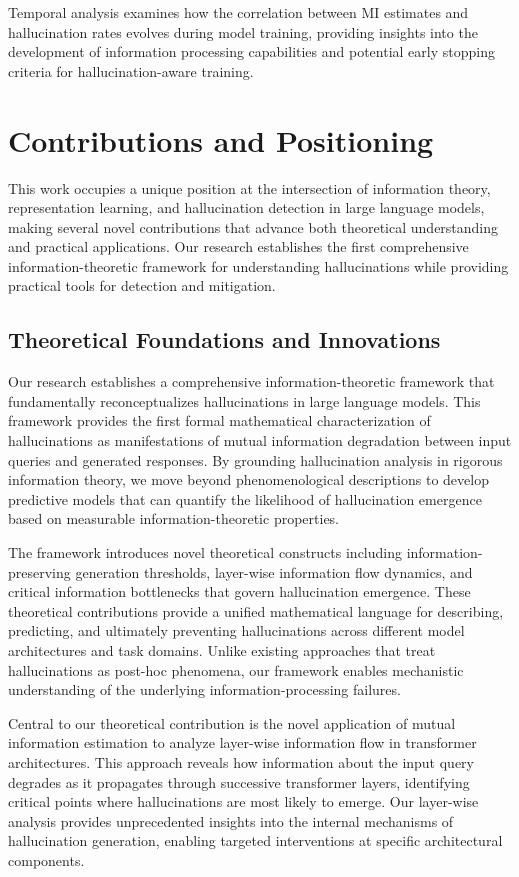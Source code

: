 Temporal analysis examines how the correlation between MI estimates and hallucination rates evolves during model training, providing insights into the development of information processing capabilities and potential early stopping criteria for hallucination-aware training.

\section{Contributions and Positioning}
\label{sec:contributions}

This work occupies a unique position at the intersection of information theory, representation learning, and hallucination detection in large language models, making several novel contributions that advance both theoretical understanding and practical applications. Our research establishes the first comprehensive information-theoretic framework for understanding hallucinations while providing practical tools for detection and mitigation.

\subsection{Theoretical Foundations and Innovations}

Our research establishes a comprehensive information-theoretic framework that fundamentally reconceptualizes hallucinations in large language models. This framework provides the first formal mathematical characterization of hallucinations as manifestations of mutual information degradation between input queries and generated responses. By grounding hallucination analysis in rigorous information theory, we move beyond phenomenological descriptions to develop predictive models that can quantify the likelihood of hallucination emergence based on measurable information-theoretic properties.

The framework introduces novel theoretical constructs including information-preserving generation thresholds, layer-wise information flow dynamics, and critical information bottlenecks that govern hallucination emergence. These theoretical contributions provide a unified mathematical language for describing, predicting, and ultimately preventing hallucinations across different model architectures and task domains. Unlike existing approaches that treat hallucinations as post-hoc phenomena, our framework enables mechanistic understanding of the underlying information-processing failures.

Central to our theoretical contribution is the novel application of mutual information estimation to analyze layer-wise information flow in transformer architectures. This approach reveals how information about the input query degrades as it propagates through successive transformer layers, identifying critical points where hallucinations are most likely to emerge. Our layer-wise analysis provides unprecedented insights into the internal mechanisms of hallucination generation, enabling targeted interventions at specific architectural components.

